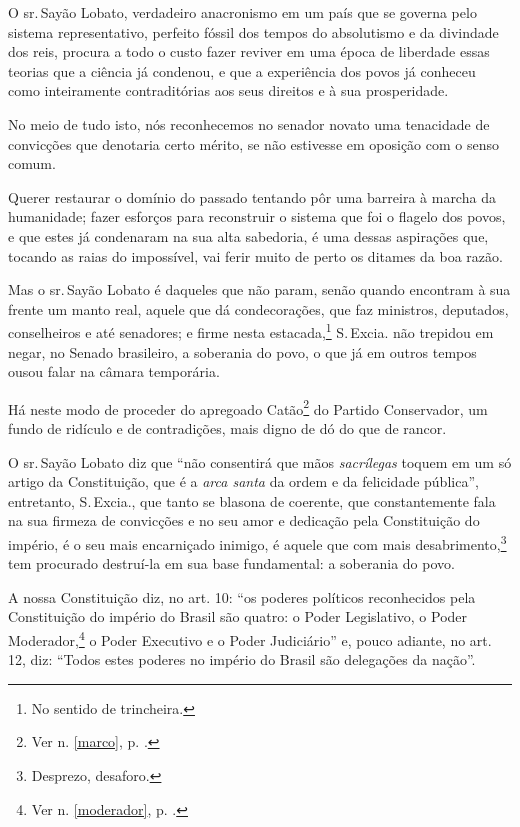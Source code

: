 O sr.\,Sayão Lobato, verdadeiro anacronismo em um país que se governa
pelo sistema representativo, perfeito fóssil dos tempos do absolutismo e
da divindade dos reis, procura a todo o custo fazer reviver em uma época
de liberdade essas teorias que a ciência já condenou, e que a
experiência dos povos já conheceu como inteiramente contraditórias aos
seus direitos e à sua prosperidade.

No meio de tudo isto, nós reconhecemos no senador novato uma tenacidade
de convicções que denotaria certo mérito, se não estivesse em oposição
com o senso comum.

Querer restaurar o domínio do passado tentando pôr uma barreira à marcha
da humanidade; fazer esforços para reconstruir o sistema que foi o
flagelo dos povos, e que estes já condenaram na sua alta sabedoria, é
uma dessas aspirações que, tocando as raias do impossível, vai ferir
muito de perto os ditames da boa razão.

Mas o sr.\,Sayão Lobato é daqueles que não param, senão quando encontram
à sua frente um manto real, aquele que dá condecorações, que faz
ministros, deputados, conselheiros e até senadores; e firme nesta
estacada,\footnote{No sentido de trincheira.} S.\,Excia. não trepidou
em negar, no Senado brasileiro, a soberania do povo, o que já em outros
tempos ousou falar na câmara temporária.

Há neste modo de proceder do apregoado Catão\footnote{Ver n. \ref{marco}, p. \pageref{marco}.} 
do Partido Conservador, um fundo de ridículo e de contradições, mais 
digno de dó do que de rancor.

O sr.\,Sayão Lobato diz que ``não consentirá que mãos \emph{sacrílegas}
toquem em um só artigo da Constituição, que é a \emph{arca santa} da
ordem e da felicidade pública'', entretanto, S.\,Excia., que tanto se
blasona de coerente, que constantemente fala na sua firmeza de
convicções e no seu amor e dedicação pela Constituição do império, é o
seu mais encarniçado inimigo, é aquele que com mais
desabrimento,\footnote{Desprezo, desaforo.} tem procurado destruí-la
em sua base fundamental: a soberania do povo.

A nossa Constituição diz, no art. 10: ``os poderes políticos reconhecidos
pela Constituição do império do Brasil são quatro: o Poder Legislativo,
o Poder Moderador,\footnote{Ver n. \ref{moderador}, p. \pageref{moderador}.} 
o Poder Executivo e o Poder Judiciário'' e, pouco adiante, no art. 12, diz: 
``Todos estes poderes no império do Brasil são delegações da nação''.

